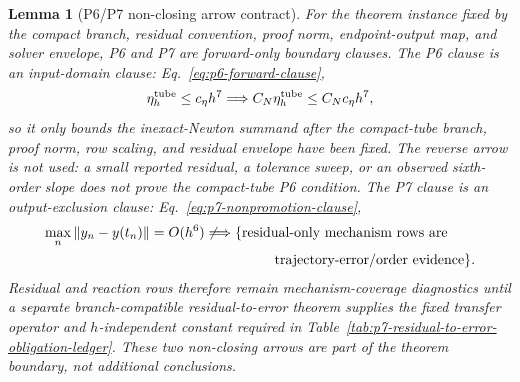 \documentclass[preprint,12pt]{elsarticle}
\newtheorem{lemma}{Lemma}
\begin{document}
\begin{lemma}[P6/P7 non-closing arrow contract]
\label{lem:p6-p7-nonclosing}
For the theorem instance fixed by the compact branch, residual convention,
proof norm, endpoint-output map, and solver envelope, P6 and P7 are
forward-only boundary clauses.  The P6 clause is an input-domain clause:
Eq.~\eqref{eq:p6-forward-clause},
\begin{equation}
\label{eq:p6-forward-clause}
  \eta_h^{\rm tube}\le c_\eta h^7
  \Longrightarrow C_N\eta_h^{\rm tube}\le C_Nc_\eta h^7 ,
\end{equation}
so it only bounds the inexact-Newton summand after the compact-tube branch,
proof norm, row scaling, and residual envelope have been fixed. The reverse
arrow is not used: a small reported residual, a tolerance sweep, or an
observed sixth-order slope does not prove the compact-tube P6 condition. The
P7 clause is an output-exclusion clause:
Eq.~\eqref{eq:p7-nonpromotion-clause},
\begin{equation}
\label{eq:p7-nonpromotion-clause}
\begin{aligned}
  \max_n\|y_n-y(t_n)\|=O(h^6)
  &\not\Longrightarrow
  \{\text{residual-only mechanism rows are}\\
  &\hspace{5.0em}\text{trajectory-error/order evidence}\}.
\end{aligned}
\end{equation}
Residual and reaction rows therefore remain mechanism-coverage diagnostics
until a separate branch-compatible residual-to-error theorem supplies the
fixed transfer operator and \(h\)-independent constant required in
Table~\ref{tab:p7-residual-to-error-obligation-ledger}. These two
non-closing arrows are part of the theorem boundary, not additional
conclusions.
\end{lemma}
\end{document}
